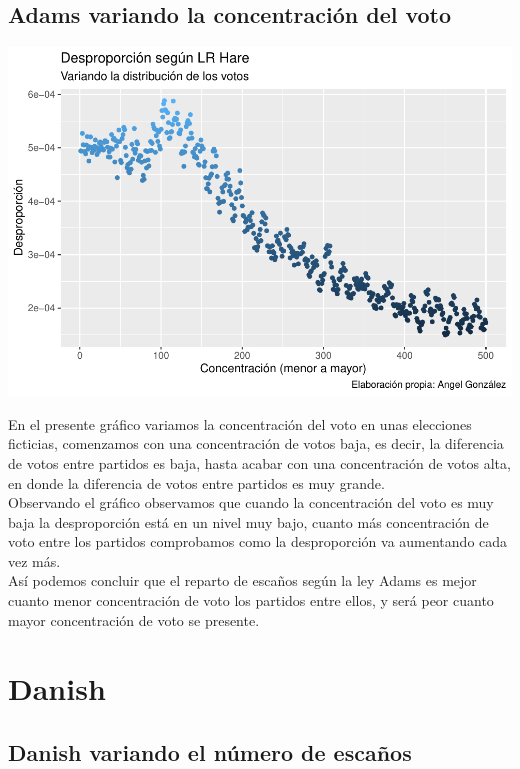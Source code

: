 \documentclass[12pt,a4paper,]{book}
\numberwithin{dummy}{section}
\theoremstyle{ocrenumbox}
\theoremstyle{blacknumex}
\theoremstyle{blacknumbox}
\theoremstyle{ocrenum}
\theoremstyle{ocrenum}
\begin{document}
\hypertarget{adams-variando-la-concentraciuxf3n-del-voto}{%
\subsection{Adams variando la concentración del
voto}\label{adams-variando-la-concentraciuxf3n-del-voto}}

\begin{center}\includegraphics[width=0.95\linewidth]{figurasR/unnamed-chunk-43-1} \end{center}

En el presente gráfico variamos la concentración del voto en unas
elecciones ficticias, comenzamos con una concentración de votos baja, es
decir, la diferencia de votos entre partidos es baja, hasta acabar con
una concentración de votos alta, en donde la diferencia de votos entre
partidos es muy grande.\\
Observando el gráfico observamos que cuando la concentración del voto es
muy baja la desproporción está en un nivel muy bajo, cuanto más
concentración de voto entre los partidos comprobamos como la
desproporción va aumentando cada vez más.\\
Así podemos concluir que el reparto de escaños según la ley Adams es
mejor cuanto menor concentración de voto los partidos entre ellos, y
será peor cuanto mayor concentración de voto se presente.

\hypertarget{danish}{%
\section{Danish}\label{danish}}

\hypertarget{danish-variando-el-nuxfamero-de-escauxf1os}{%
\subsection{Danish variando el número de
escaños}\label{danish-variando-el-nuxfamero-de-escauxf1os}}
\end{document}
